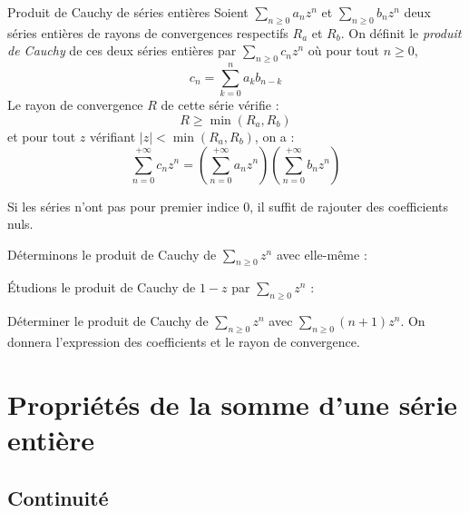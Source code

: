 \documentclass[french,11pt,twoside]{VcCours}
\begin{document}
\begin{Theoreme}{Produit de Cauchy de séries entières}
Soient $\sum_{n \geq 0} a_n z^n$ et $\sum_{n \geq 0} b_n z^n$ deux séries entières de rayons de convergences respectifs $R_a$ et $R_b$. On définit le \emph{produit de Cauchy} de ces deux séries entières par $\sum_{n \geq 0} c_n z^n$ où pour tout $n \geq 0$,
$$ c_n =  \sum_{k=0}^n a_k b_{n-k}  $$
Le rayon de convergence $R$ de cette série vérifie :
$$ R \geq \min(R_a,R_b)$$
et pour tout $z$ vérifiant $\vert z \vert < \min(R_a,R_b)$, on a :
$$ \sum_{n=0}^{+ \infty} c_n z^n = \left( \sum _{n=0}^{+ \infty} a_n z^n \right)  \left( \sum _{n=0}^{+ \infty} b_n z^n \right)$$
\end{Theoreme}

\begin{Remarque}{} Si les séries n'ont pas pour premier indice $0$, il suffit de rajouter des coefficients nuls.
\end{Remarque}

\begin{Demonstration}{}

\vspace{4cm}
\end{Demonstration}

\begin{Exemple}{} Déterminons le produit de Cauchy de $\sum_{n \geq 0} z^n$ avec elle-même :

\vspace{5cm}
\end{Exemple}

\newpage
\begin{Exemple}{} Étudions le produit de Cauchy de $1-z$ par $\sum_{n \geq 0} z^n$ :

\vspace{6.5cm}
\end{Exemple}



\begin{ApplicationDirecte}{} Déterminer le produit de Cauchy de $\sum_{n \geq 0} z^n$ avec $\sum_{n \geq 0} (n+1)z^n$. On donnera l'expression des coefficients et le rayon de convergence.
\end{ApplicationDirecte}

\section{Propriétés de la somme d'une série entière}

\subsection{Continuité}
\end{document}
